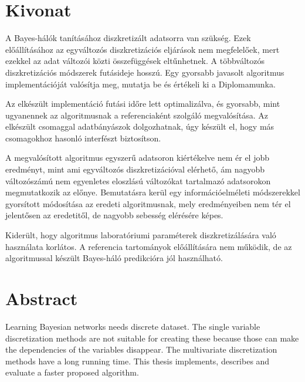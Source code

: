\setcounter{page}{1}

\selecthungarian

\chapter*{Kivonat}

A Bayes-hálók tanításához diszkretizált adatsorra van szükség. Ezek előállításához az egyváltozós diszkretizációs eljárások nem megfelelőek, mert ezekkel az adat változói közti összefüggések eltűnhetnek. A többváltozós diszkretizációs módszerek futásideje hosszú. Egy gyorsabb javasolt algoritmus implementációját valósítja meg, mutatja be és értékeli ki a Diplomamunka.

Az elkészült implementáció futási időre lett optimalizálva, és gyorsabb, mint ugyanennek az algoritmusnak a referenciaként szolgáló megvalósítása. Az elkészült csomaggal adatbányászok dolgozhatnak, úgy készült el, hogy más csomagokhoz hasonló interfészt biztosítson.

A megvalósított algoritmus egyszerű adatsoron kiértékelve nem ér el jobb eredményt, mint ami egyváltozós diszkretizációval elérhető, ám nagyobb változószámú nem egyenletes eloszlású változókat tartalmazó adatsorokon megmutatkozik az előnye. Bemutatásra kerül egy információelméleti módszerekkel gyorsított módosítása az eredeti algoritmusnak, mely eredményeiben nem tér el jelentősen az eredetitől, de nagyobb sebesség elérésére képes.

Kiderült, hogy algoritmus laboratóriumi paraméterek diszkretizálására való használata korlátos. A referencia tartományok előállítására nem működik, de az algoritmussal készült Bayes-háló predikcióra jól használható.

\vfill
\selectenglish


\chapter*{Abstract}

Learning Bayesian networks needs discrete dataset. The single variable discretization methods are not suitable for creating these because those can make the dependencies of the variables disappear. The multivariate discretization methods have a long running time. This thesis implements, describes and evaluate a faster proposed algorithm.

